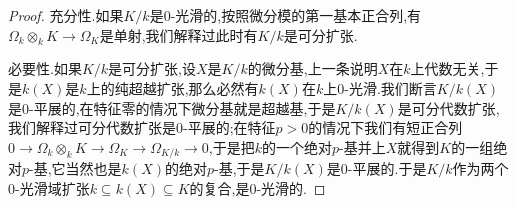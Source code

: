 \begin{enumerate}
\begin{proof}
    	充分性.如果$K/k$是0-光滑的,按照微分模的第一基本正合列,有$\Omega_k\otimes_kK\to\Omega_K$是单射,我们解释过此时有$K/k$是可分扩张.
    	
    	\qquad
    	
    	必要性.如果$K/k$是可分扩张,设$X$是$K/k$的微分基,上一条说明$X$在$k$上代数无关,于是$k(X)$是$k$上的纯超越扩张,那么必然有$k(X)$在$k$上0-光滑.我们断言$K/k(X)$是0-平展的,在特征零的情况下微分基就是超越基,于是$K/k(X)$是可分代数扩张,我们解释过可分代数扩张是0-平展的;在特征$p>0$的情况下我们有短正合列$0\to\Omega_k\otimes_kK\to\Omega_K\to\Omega_{K/k}\to0$,于是把$k$的一个绝对$p$-基并上$X$就得到$K$的一组绝对$p$-基,它当然也是$k(X)$的绝对$p$-基,于是$K/k(X)$是0-平展的.于是$K/k$作为两个0-光滑域扩张$k\subseteq k(X)\subseteq K$的复合,是0-光滑的.
    \end{proof}
\end{enumerate}

